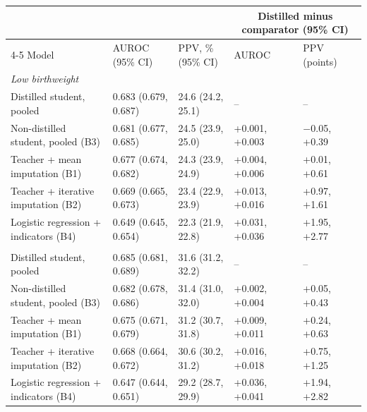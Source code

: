 \begin{tabular}{lllll}
\toprule
 & & & \multicolumn{2}{c}{Distilled minus comparator (95\% CI)}\\
\cmidrule(lr){4-5}
Model & AUROC (95\% CI) & PPV, \% (95\% CI) & AUROC & PPV (points)\\
\midrule
\multicolumn{5}{l}{\textit{Low birthweight}}\\
\quad Distilled student, pooled & 0.683 (0.679, 0.687) & 24.6 (24.2, 25.1) & -- & --\\
\quad Non-distilled student, pooled (B3) & 0.681 (0.677, 0.685) & 24.5 (23.9, 25.0) & +0.001, +0.003 & $-$0.05, +0.39\\
\quad Teacher + mean imputation (B1) & 0.677 (0.674, 0.682) & 24.3 (23.9, 24.9) & +0.004, +0.006 & +0.01, +0.61\\
\quad Teacher + iterative imputation (B2) & 0.669 (0.665, 0.673) & 23.4 (22.9, 23.9) & +0.013, +0.016 & +0.97, +1.61\\
\quad Logistic regression + indicators (B4) & 0.649 (0.645, 0.654) & 22.3 (21.9, 22.8) & +0.031, +0.036 & +1.95, +2.77\\
\addlinespace
\multicolumn{5}{l}{\textit{Preterm birth}}\\
\quad Distilled student, pooled & 0.685 (0.681, 0.689) & 31.6 (31.2, 32.2) & -- & --\\
\quad Non-distilled student, pooled (B3) & 0.682 (0.678, 0.686) & 31.4 (31.0, 32.0) & +0.002, +0.004 & +0.05, +0.43\\
\quad Teacher + mean imputation (B1) & 0.675 (0.671, 0.679) & 31.2 (30.7, 31.8) & +0.009, +0.011 & +0.24, +0.63\\
\quad Teacher + iterative imputation (B2) & 0.668 (0.664, 0.672) & 30.6 (30.2, 31.2) & +0.016, +0.018 & +0.75, +1.25\\
\quad Logistic regression + indicators (B4) & 0.647 (0.644, 0.651) & 29.2 (28.7, 29.9) & +0.036, +0.041 & +1.94, +2.82\\
\bottomrule
\end{tabular}
